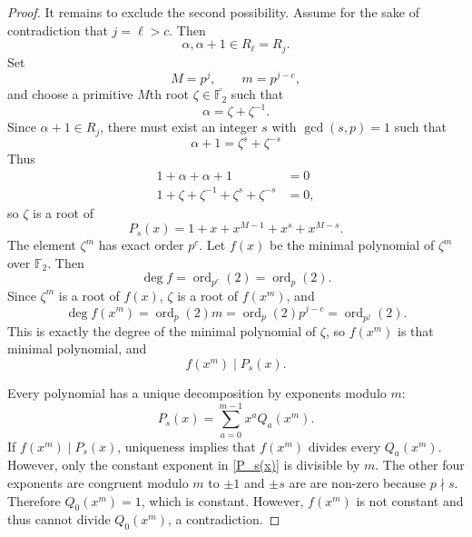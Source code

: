 \documentclass[a4paper]{article}
\newcommand{\F}{\mathbb{F}}
\newcommand{\ord}[2][]{\operatorname{ord}_{#1}\!\left( #2 \right)}
\begin{document}
\begin{proof}
		It remains to exclude the second possibility.
		Assume for the sake of contradiction that $j = \ell > c$.
		Then
		\begin{equation*}
			\alpha, \alpha+1 \in R_\ell = R_j.
		\end{equation*}
		Set
		\begin{equation*}
			M = p^j, \qquad m = p^{j-c},
		\end{equation*}
		and choose a primitive $M$th root $\zeta \in \overline{\F_2}$ such that
		\begin{equation*}
			\alpha = \zeta + \zeta^{-1}.
		\end{equation*}
		Since $\alpha+1 \in R_j$, there must exist an integer $s$ with $\gcd{(s,p)} = 1$ such that
		\begin{equation*}
			\alpha+1 = \zeta^{s} + \zeta^{-s}
		\end{equation*}
		Thus
		\begin{align*}
			1 + \alpha + \alpha+1 &= 0 \\
			1 + \zeta + \zeta^{-1} + \zeta^{s} + \zeta^{-s} &= 0,
		\end{align*}
		so $\zeta$ is a root of
		\begin{equation}\label{P_s(x)}
			P_s(x) = 1 + x + x^{M-1} + x^s + x^{M-s}.
		\end{equation}
		The element $\zeta^m$ has exact order $p^c$.
		Let $f(x)$ be the minimal polynomial of $\zeta^m$ over $\F_2$.
		Then
		\begin{equation*}
			\deg{f} = \ord[p^c]{2} = \ord[p]{2}.
		\end{equation*}
		Since $\zeta^m$ is a root of $f(x)$, $\zeta$ is a root of $f(x^m)$, and
		\begin{equation*}
			\deg{f(x^m)} = \ord[p]{2}m = \ord[p]{2}p^{j-c} = \ord[p^j]{2}.
		\end{equation*}
		This is exactly the degree of the minimal polynomial of $\zeta$, so $f(x^m)$ is that minimal polynomial, and
		\begin{equation*}
			f(x^m) \mid P_s(x).
		\end{equation*}
	
		Every polynomial has a unique decomposition by exponents modulo $m$:
		\begin{equation*}
			P_s(x) = \sum_{a=0}^{m-1}{x^a Q_a(x^m)}.
		\end{equation*}
		If $f(x^m) \mid P_s(x)$, uniqueness implies that $f(x^m)$ divides every $Q_a(x^m)$.
		However, only the constant exponent in \eqref{P_s(x)} is divisible by $m$.
		The other four exponents are congruent modulo $m$ to $\pm 1$ and $\pm s$ are are non-zero because $p \nmid s$.
		Therefore $Q_0(x^m) = 1$, which is constant.
		However, $f(x^m)$ is not constant and thus cannot divide $Q_0(x^m)$, a contradiction.
		

\end{proof}
\end{document}
